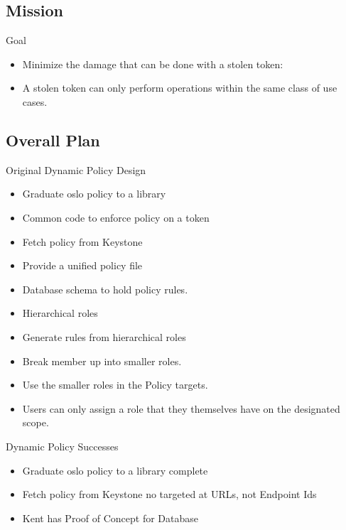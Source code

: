 \documentclass{beamer}
\begin{document}
\subsection {Mission}

\begin{frame}{Goal}
  \begin{itemize}
  \item Minimize the damage that can be done with a stolen token:
  \item A stolen token can only perform operations within the same class of use cases.
  \end {itemize}
\end {frame}

\subsection {Overall Plan}


\begin{frame}{Original Dynamic Policy Design}
  \begin{itemize}
  \item Graduate oslo policy to a library
  \item Common code to enforce policy on a token
  \item Fetch policy from Keystone
  \item Provide a unified policy file
  \item Database schema to hold policy rules.  
  \item Hierarchical roles
  \item Generate rules from hierarchical roles
  \item Break member up into smaller roles.
  \item Use the smaller roles in the Policy targets.
  \item Users can only assign a role that they themselves have on the designated scope.
  \end{itemize}
\end{frame}

\begin{frame}{Dynamic Policy Successes}
  \begin{itemize}
  \item Graduate oslo policy to a library complete
  \item Fetch policy from Keystone no targeted at URLs, not Endpoint Ids
  \item Kent has Proof of Concept for Database
  \end{itemize}
\end{frame}
\end{document}
